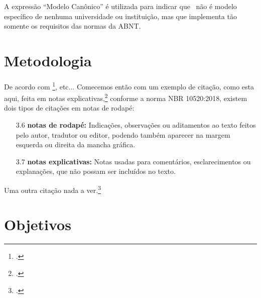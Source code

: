 \documentclass[
	12pt,				%
	openright,			%
	twoside,			%
	a4paper,			%
	english,			%
	brazil				%
	]{abntex2}
\begin{document}
A expressão ``Modelo Canônico'' é utilizada para indicar que \abnTeX\ não é modelo específico de nenhuma universidade ou instituição, mas que implementa tão somente os requisitos das normas da ABNT.

\section{Metodologia}
De acordo com \footcite[Descartes foi um grande filósofo francês do século XVII. Veja em][p.~10]{descartes-carta-mersene},  etc... Comecemos então com um exemplo de citação, como esta aqui, feita em notas explicativas,\footcite[Esta é uma nota explicativa. Cf. e.g.,][\S 12]{boyle1772} conforme a norma NBR 10520:2018, existem dois tipos de citações em notas de rodapé:
\begin{citacao}
	\begin{itemize}
		\item[$3.6$] \textbf{notas de rodapé:} Indicações, observações ou aditamentos ao texto feitos pelo autor, tradutor ou editor, podendo	também aparecer na margem esquerda ou direita da mancha gráfica.
		\item[$3.7$] \textbf{notas explicativas:} Notas usadas para comentários, esclarecimentos ou explanações, que não possam ser incluídos no texto.
	\end{itemize}
\end{citacao}


Uma outra citação nada a ver.\footcite[Esta é uma outra nota explicativa. Ver também ][p.~12]{herao}


\lipsum[1]

\section{Objetivos}
\end{document}
